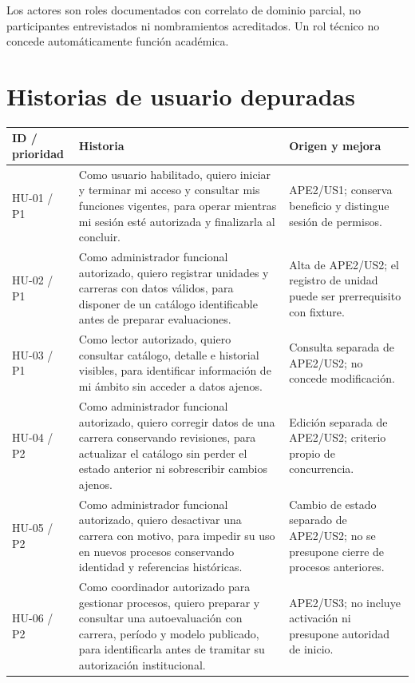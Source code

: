\documentclass[12pt,a4paper]{report}
\begin{document}
Los actores son roles documentados con correlato de dominio parcial, no
participantes entrevistados ni nombramientos acreditados. Un rol técnico
no concede automáticamente función académica.

\section{Historias de usuario
depuradas}\label{dossier-historias-de-usuario-depuradas}
{\def\LTcaptype{none} %
\begin{longtable}[]{@{}
  >{\raggedright\arraybackslash}p{}
  >{\raggedright\arraybackslash}p{}
  >{\raggedright\arraybackslash}p{}@{}}
\toprule\noalign{}
\begin{minipage}[b]{\linewidth}\raggedright
ID / prioridad
\end{minipage} & \begin{minipage}[b]{\linewidth}\raggedright
Historia
\end{minipage} & \begin{minipage}[b]{\linewidth}\raggedright
Origen y mejora
\end{minipage} \\
\midrule\noalign{}
\endhead
\bottomrule\noalign{}
\endlastfoot
HU-01 / P1 & Como usuario habilitado, quiero iniciar y terminar mi
acceso y consultar mis funciones vigentes, para operar mientras mi
sesión esté autorizada y finalizarla al concluir. & APE2/US1; conserva
beneficio y distingue sesión de permisos. \\
HU-02 / P1 &Como administrador funcional autorizado, quiero
registrar unidades y carreras con datos válidos, para disponer de un
catálogo identificable antes de preparar evaluaciones. & Alta de
APE2/US2; el registro de unidad puede ser prerrequisito con fixture. \\
HU-03 / P1 & Como lector autorizado, quiero consultar catálogo,
detalle e historial visibles, para identificar información de mi ámbito
sin acceder a datos ajenos. & Consulta separada de APE2/US2; no concede
modificación. \\
HU-04 / P2 & Como administrador funcional autorizado, quiero corregir
datos de una carrera conservando revisiones, para actualizar el catálogo
sin perder el estado anterior ni sobrescribir cambios ajenos. & Edición
separada de APE2/US2; criterio propio de concurrencia. \\
HU-05 / P2 & Como administrador funcional autorizado, quiero
desactivar una carrera con motivo, para impedir su uso en nuevos
procesos conservando identidad y referencias históricas. & Cambio de
estado separado de APE2/US2; no se presupone cierre de procesos
anteriores. \\
HU-06 / P2 & Como coordinador autorizado para gestionar procesos,
quiero preparar y consultar una autoevaluación con carrera, período y
modelo publicado, para identificarla antes de tramitar su autorización
institucional. & APE2/US3; no incluye activación ni presupone autoridad
de inicio. \\
\end{longtable}
}
\end{document}
